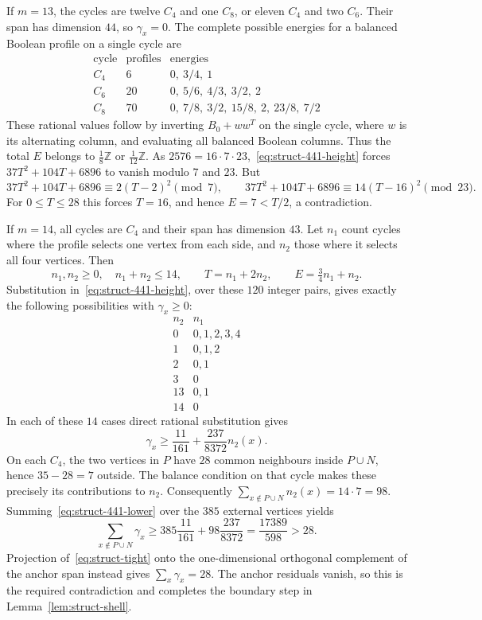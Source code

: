 \documentclass[11pt]{article}
\theoremstyle{remark}
\numberwithin{equation}{section}
\begin{document}
If $m=13$, the cycles are twelve $C_4$ and one $C_8$, or eleven
$C_4$ and two $C_6$.  Their span has dimension $44$, so
$\gamma_x=0$.  The complete possible energies for a balanced
Boolean profile on a single cycle are
\[
\begin{array}{c|c|l}
\text{cycle}&\text{profiles}&\text{energies}\\\hline
C_4&6&0,\ 3/4,\ 1\\
C_6&20&0,\ 5/6,\ 4/3,\ 3/2,\ 2\\
C_8&70&0,\ 7/8,\ 3/2,\ 15/8,\ 2,\ 23/8,\ 7/2
\end{array}
\]
These rational values follow by inverting $B_0+ww^T$ on the
single cycle, where $w$ is its alternating column, and evaluating
all balanced Boolean columns.  Thus the total $E$ belongs to
$\frac18\mathbb Z$ or $\frac1{12}\mathbb Z$.
As $2576=16\cdot7\cdot23$,~\eqref{eq:struct-441-height} forces
$37T^2+104T+6896$ to vanish modulo $7$ and $23$.  But
\[
 37T^2+104T+6896\equiv2(T-2)^2\pmod7,
 \qquad
 37T^2+104T+6896\equiv14(T-16)^2\pmod{23}.
\]
For $0\le T\le28$ this forces $T=16$, and hence $E=7<T/2$,
a contradiction.

If $m=14$, all cycles are $C_4$ and their span has dimension $43$.
Let $n_1$ count cycles where the profile selects one vertex from
each side, and $n_2$ those where it selects all four vertices.
Then
\[
 n_1,n_2\ge0,\quad n_1+n_2\le14,\qquad
 T=n_1+2n_2,\qquad E=\tfrac34n_1+n_2.
\]
Substitution in~\eqref{eq:struct-441-height}, over these $120$
integer pairs, gives exactly the following possibilities with
$\gamma_x\ge0$:
\[
\begin{array}{c|c}
n_2& n_1\\\hline
0&0,1,2,3,4\\
1&0,1,2\\
2&0,1\\
3&0\\
13&0,1\\
14&0
\end{array}
\]
In each of these $14$ cases direct rational substitution gives
\begin{equation}\label{eq:struct-441-lower}
 \gamma_x\ge\frac{11}{161}+\frac{237}{8372}n_2(x).
\end{equation}
On each $C_4$, the two vertices in $P$ have $28$ common neighbours
inside $P\cup N$, hence $35-28=7$ outside.  The balance condition
on that cycle makes these precisely its contributions to $n_2$.
Consequently $\sum_{x\notin P\cup N}n_2(x)=14\cdot7=98$.
Summing~\eqref{eq:struct-441-lower} over the $385$ external vertices
yields
\[
 \sum_{x\notin P\cup N}\gamma_x
 \ge385\frac{11}{161}+98\frac{237}{8372}
 =\frac{17389}{598}>28.
\]
Projection of~\eqref{eq:struct-tight} onto the one-dimensional
orthogonal complement of the anchor span instead gives
$\sum_x\gamma_x=28$.  The anchor residuals vanish, so this is the
required contradiction and completes the boundary step in
Lemma~\ref{lem:struct-shell}.
\end{document}
